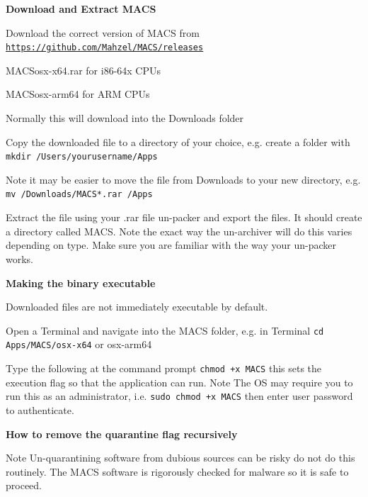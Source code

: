 \textbf{Download and Extract MACS}

\begin{compactenum}
    \item Download the correct version of MACS from \href{https://github.com/Mahzel/MACS/releases}{\texttt{https://github.com/Mahzel/MACS/releases}}
    \begin{compactitem}
        \item MACSosx-x64.rar for i86-64x CPUs
        \item MACSosx-arm64 for ARM CPUs
    \end{compactitem}
    \item Normally this will download into the Downloads folder
    \item Copy the downloaded file to a directory of your choice, e.g. create a folder with \\
    \texttt{mkdir /Users/yourusername/Apps}
    \begin{compactitem}
        \item Note it may be easier to move the file from Downloads to your new directory, e.g. \texttt{mv /Downloads/MACS*.rar /Apps}
    \end{compactitem}   
    \item Extract the file using your .rar file un-packer and export the files. It should create a directory called MACS. Note the exact way the un-archiver will do this varies depending on type. Make sure you are familiar with the way your un-packer works.
\end{compactenum}

\textbf{Making the binary executable}

Downloaded files are not immediately executable by default.

\begin{compactenum}
    \item Open a Terminal and navigate into the MACS folder, e.g. in Terminal \texttt{cd Apps/MACS/osx-x64} or osx-arm64
    \item Type the following at the command prompt \texttt{chmod +x MACS} this sets the execution flag so that the application can run. Note The OS may require you to run this as an administrator, i.e. \texttt{sudo chmod +x MACS} then enter user password to authenticate.
\end{compactenum}

\textbf{How to remove the quarantine flag recursively}

\begin{advisory}
    Note Un-quarantining software from dubious sources can be risky do not do this routinely. The MACS software is rigorously checked for malware so it is safe to proceed.
\end{advisory}

